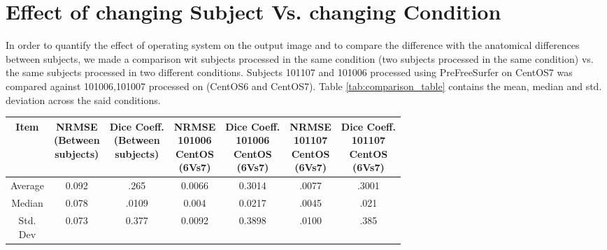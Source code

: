 \section{Effect of changing Subject Vs. changing Condition}\label{sec:comparison}
In order to quantify the effect of operating system on the output image and to compare the difference with the anatomical differences between subjects, we made a comparison wit subjects processed in the same condition (two subjects processed in the same condition) vs. the same subjects processed in two different conditions. Subjects 101107 and 101006 processed using PreFreeSurfer on CentOS7 was compared against 101006,101007 processed on (CentOS6 and CentOS7). Table \ref{tab:comparison_table} contains the mean, median and std. deviation across the said conditions.

\hfill \break
\begin{center}
\begin{tabularx}{.99\textwidth}{|c|c|c|c|c|c|c|}
\hline
Item  & \makecell[l]{NRMSE\\(Between\\subjects)} & \makecell[l]{Dice Coeff.\\(Between\\subjects)} & \makecell[l]{NRMSE\\101006\\CentOS\\(6Vs7)} & \makecell[l]{Dice Coeff.\\ 101006\\CentOS\\(6Vs7)} & \makecell[l]{NRMSE\\101107\\CentOS\\(6Vs7)} & \makecell[l]{Dice Coeff.\\ 101107\\CentOS\\(6Vs7)} \\ \hline
Average            & 0.092        & .265      & 0.0066     & 0.3014   & .0077   & .3001     \\ \hline
Median             & 0.078    & .0109       & 0.004          & 0.0217           & .0045     & .021  \\ \hline
\makecell[l]{Std.\\Dev} & 0.073     & 0.377           & 0.0092         & 0.3898   & .0100       & .385 \\ \hline
\end{tabularx}
\label{tab:comparison_table}
\end{center}
